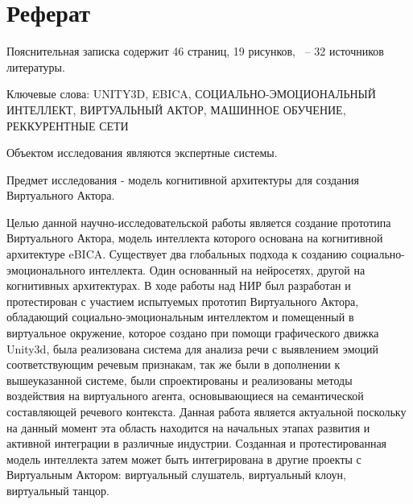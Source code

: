 \chapter*{Реферат}
\thispagestyle{plain}


Пояснительная записка содержит 46 страниц, 19 рисунков, ~-- 32 источников литературы.

Ключевые слова: UNITY3D, EBICA, СОЦИАЛЬНО-ЭМОЦИОНАЛЬНЫЙ ИНТЕЛЛЕКТ, ВИРТУАЛЬНЫЙ АКТОР, МАШИННОЕ ОБУЧЕНИЕ, РЕККУРЕНТНЫЕ СЕТИ 

Объектом исследования являются экспертные системы.

Предмет исследования - модель когнитивной архитектуры для создания Виртуального Актора.

Целью данной научно-исследовательской работы является создание прототипа Виртуального Актора, 
модель интеллекта которого основана на когнитивной архитектуре eBICA.
Существует два глобальных подхода к созданию социально-эмоционального интеллекта. 
Один основанный на нейросетях, другой на когнитивных архитектурах.
В ходе работы над НИР был разработан и протестирован с участием испытуемых прототип Виртуального Актора, 
обладающий социально-эмоциональным интеллектом и помещенный в виртуальное окружение, которое создано при помощи графического движка Unity3d, 
была реализована система для анализа речи с выявлением эмоций соответствующим речевым признакам, так же были
в дополнении к вышеуказанной системе, были спроектированы и реализованы методы 
воздействия на виртуального агента, основывающиеся на семантической составляющей речевого контекста.
Данная работа является актуальной поскольку на данный момент эта область находится на начальных этапах 
развития и активной интеграции в различные индустрии.
Созданная и протестированная модель интеллекта затем может быть интегрирована в другие проекты с 
Виртуальным Актором: виртуальный слушатель, виртуальный клоун, виртуальный танцор. 



